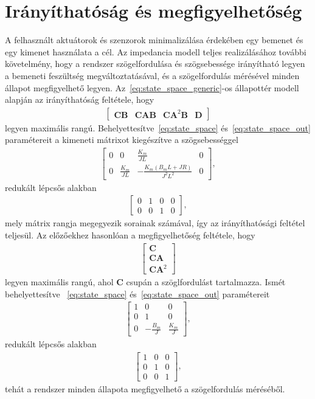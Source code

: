\section{Irányíthatóság és megfigyelhetőség}
A felhasznált aktuátorok és szenzorok minimalizálása érdekében egy bemenet és egy kimenet használata a cél. 
Az impedancia modell teljes realizálásához további követelmény, hogy a rendszer szögelfordulása és szögsebessége
irányítható legyen a bemeneti feszültség megváltoztatásával, és a szögelfordulás mérésével minden állapot 
megfigyelhető legyen. Az~\eqref{eq:state_space_generic}-os állapottér modell alapján az irányíthatóság feltétele, hogy
\begin{align}
    \left[\begin{array}{c|c|c|c}
        \bm{CB} & \bm{CAB} & \bm C \bm A^2 \bm B & \bm D
    \end{array}\right]
\end{align}
legyen maximális rangú. Behelyettesítve~\eqref{eq:state_space} és~\eqref{eq:state_space_out} paramétereit a kimeneti mátrixot kiegészítve a szögsebességgel
\begin{align}
    \begin{bmatrix}
        0 & 0 & \frac{K_m}{JL} & 0 \\
        0 & \frac{K_m}{JL} & -\frac{K_m\left(B_m L + JR\right)}{J^2L^2} & 0
    \end{bmatrix},
\end{align}
redukált lépcsős alakban
\begin{align}
    \begin{bmatrix}
        0 & 1 & 0 & 0 \\
        0 & 0 & 1 & 0
    \end{bmatrix},
\end{align}
mely mátrix rangja megegyezik sorainak számával, így az irányíthatósági feltétel teljesül. Az előzőekhez hasonlóan a 
megfigyelhetőség feltétele, hogy
\begin{align}
    \left[\begin{array}{c}
        \bm{C} \\ \hline
        \bm{CA} \\ \hline
        \bm C \bm A^2
    \end{array}\right]
\end{align}
legyen maximális rangú, ahol $\bm C$ csupán a szöglfordulást tartalmazza. Ismét behelyettesítve
~\eqref{eq:state_space} és~\eqref{eq:state_space_out} paramétereit
\begin{align}
    \begin{bmatrix}
        1 & 0 & 0 \\
        0 & 1 & 0 \\
        0 & -\frac{B_m}{J} & \frac{K_m}{J}
    \end{bmatrix},
\end{align}
redukált lépcsős alakban
\begin{align}
    \begin{bmatrix}
        1 & 0 & 0 \\
        0 & 1 & 0 \\
        0 & 0 & 1
    \end{bmatrix},
\end{align}
tehát a rendszer minden állapota megfigyelhető a szögelfordulás méréséből.
